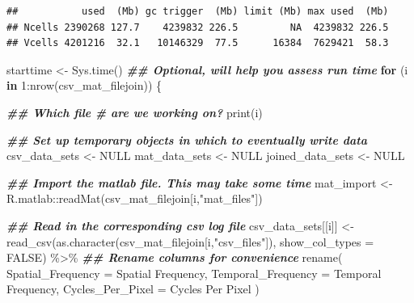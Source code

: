 \documentclass[
]{book}
\newenvironment{Shaded}{\begin{snugshade}}{\end{snugshade}}
\newcommand{\AttributeTok}[1]{\textcolor[rgb]{0.77,0.63,0.00}{#1}}
\newcommand{\ConstantTok}[1]{\textcolor[rgb]{0.00,0.00,0.00}{#1}}
\newcommand{\ControlFlowTok}[1]{\textcolor[rgb]{0.13,0.29,0.53}{\textbf{#1}}}
\newcommand{\DecValTok}[1]{\textcolor[rgb]{0.00,0.00,0.81}{#1}}
\newcommand{\DocumentationTok}[1]{\textcolor[rgb]{0.56,0.35,0.01}{\textbf{\textit{#1}}}}
\newcommand{\FunctionTok}[1]{\textcolor[rgb]{0.00,0.00,0.00}{#1}}
\newcommand{\NormalTok}[1]{#1}
\newcommand{\OtherTok}[1]{\textcolor[rgb]{0.56,0.35,0.01}{#1}}
\newcommand{\SpecialCharTok}[1]{\textcolor[rgb]{0.00,0.00,0.00}{#1}}
\newcommand{\StringTok}[1]{\textcolor[rgb]{0.31,0.60,0.02}{#1}}
\begin{document}
\begin{verbatim}
##           used  (Mb) gc trigger  (Mb) limit (Mb) max used  (Mb)
## Ncells 2390268 127.7    4239832 226.5         NA  4239832 226.5
## Vcells 4201216  32.1   10146329  77.5      16384  7629421  58.3
\end{verbatim}

\begin{Shaded}
\begin{Highlighting}[]
\NormalTok{starttime }\OtherTok{\textless{}{-}} \FunctionTok{Sys.time}\NormalTok{() }\DocumentationTok{\#\# Optional, will help you assess run time}
\ControlFlowTok{for}\NormalTok{ (i }\ControlFlowTok{in} \DecValTok{1}\SpecialCharTok{:}\FunctionTok{nrow}\NormalTok{(csv\_mat\_filejoin)) \{}

  \DocumentationTok{\#\# Which file \# are we working on?}
  \FunctionTok{print}\NormalTok{(i)}

  \DocumentationTok{\#\# Set up temporary objects in which to eventually write data}
\NormalTok{  csv\_data\_sets }\OtherTok{\textless{}{-}} \ConstantTok{NULL}
\NormalTok{  mat\_data\_sets }\OtherTok{\textless{}{-}} \ConstantTok{NULL}
\NormalTok{  joined\_data\_sets }\OtherTok{\textless{}{-}} \ConstantTok{NULL}

  \DocumentationTok{\#\# Import the matlab file. This may take some time}
\NormalTok{  mat\_import }\OtherTok{\textless{}{-}}
\NormalTok{    R.matlab}\SpecialCharTok{::}\FunctionTok{readMat}\NormalTok{(csv\_mat\_filejoin[i,}\StringTok{"mat\_files"}\NormalTok{])}

  \DocumentationTok{\#\# Read in the corresponding csv log file}
\NormalTok{  csv\_data\_sets[[i]] }\OtherTok{\textless{}{-}}
    \FunctionTok{read\_csv}\NormalTok{(}\FunctionTok{as.character}\NormalTok{(csv\_mat\_filejoin[i,}\StringTok{"csv\_files"}\NormalTok{]),}
             \AttributeTok{show\_col\_types =} \ConstantTok{FALSE}\NormalTok{) }\SpecialCharTok{\%\textgreater{}\%}
    \DocumentationTok{\#\# Rename columns for convenience}
    \FunctionTok{rename}\NormalTok{(}
      \AttributeTok{Spatial\_Frequency =} \StringTok{\textasciigrave{}}\AttributeTok{Spatial Frequency}\StringTok{\textasciigrave{}}\NormalTok{,}
      \AttributeTok{Temporal\_Frequency =} \StringTok{\textasciigrave{}}\AttributeTok{Temporal Frequency}\StringTok{\textasciigrave{}}\NormalTok{,}
      \AttributeTok{Cycles\_Per\_Pixel =} \StringTok{\textasciigrave{}}\AttributeTok{Cycles Per Pixel}\StringTok{\textasciigrave{}}
\NormalTok{    )}


\end{Highlighting}
\end{Shaded}
\end{document}
